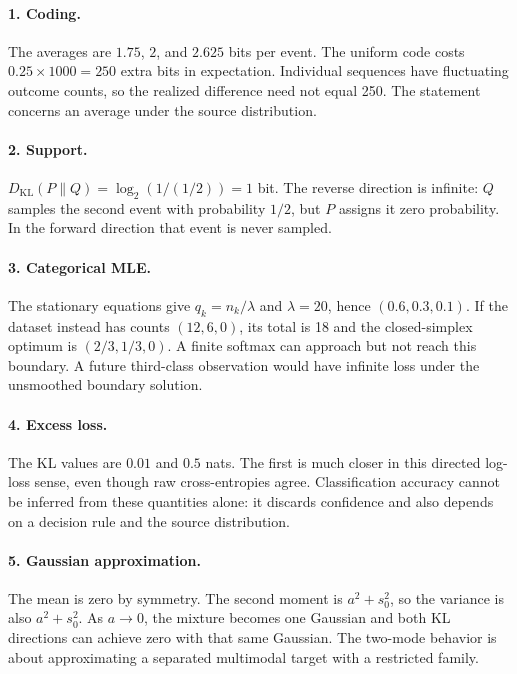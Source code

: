 \paragraph{1. Coding.}
The averages are $1.75$, $2$, and $2.625$ bits per event. The uniform code costs
$0.25\times1000=250$ extra bits in expectation. Individual sequences have
fluctuating outcome counts, so the realized difference need not equal 250.
The statement concerns an average under the source distribution.

\paragraph{2. Support.}
$D_{\mathrm{KL}}(P\|Q)=\log_2(1/(1/2))=1$ bit. The reverse direction is infinite:
$Q$ samples the second event with probability $1/2$, but $P$ assigns it zero
probability. In the forward direction that event is never sampled.

\paragraph{3. Categorical MLE.}
The stationary equations give $q_k=n_k/\lambda$ and $\lambda=20$, hence
$(0.6,0.3,0.1)$. If the dataset instead has counts $(12,6,0)$, its total is 18
and the closed-simplex optimum is $(2/3,1/3,0)$. A finite softmax can approach but
not reach this boundary. A future third-class observation would have infinite
loss under the unsmoothed boundary solution.

\paragraph{4. Excess loss.}
The KL values are $0.01$ and $0.5$ nats. The first is much closer in this directed
log-loss sense, even though raw cross-entropies agree. Classification accuracy
cannot be inferred from these quantities alone: it discards confidence and also
depends on a decision rule and the source distribution.

\paragraph{5. Gaussian approximation.}
The mean is zero by symmetry. The second moment is $a^2+s_0^2$, so the variance
is also $a^2+s_0^2$. As $a\to0$, the mixture becomes one Gaussian and both KL
directions can achieve zero with that same Gaussian. The two-mode behavior is
about approximating a separated multimodal target with a restricted family.

